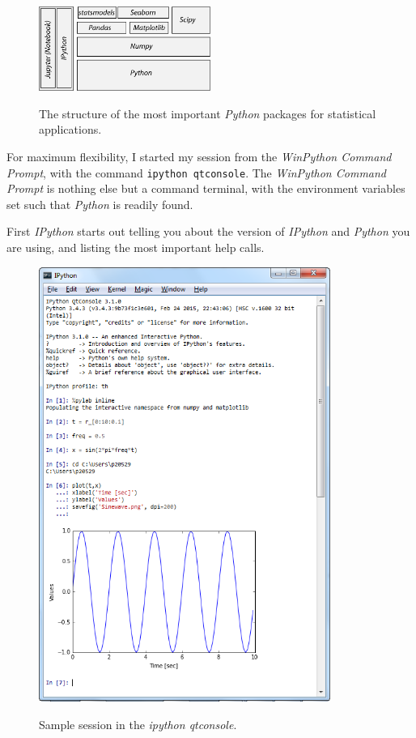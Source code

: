 \begin{figure}[h]
  \centering
  \includegraphics[width=0.5\textwidth]{../Images/ScientificPython.jpg}\\
  \caption{The structure of the most important \emph{Python} packages for statistical applications.}
  \label{fig:scientificPython}
\end{figure}

For maximum flexibility, I started my session from the \emph{WinPython Command Prompt}, with the command \lstinline{ipython qtconsole}. The \emph{WinPython Command Prompt} is nothing else but a command terminal, with the environment variables set such that \emph{Python} is readily found.

First \emph{IPython} starts out telling you about the version of \emph{IPython} and \emph{Python} you are using, and listing the most important help calls.

\begin{figure}
  \centering
  \includegraphics[width=0.85\textwidth]{../Images/qtConsole.png}\\
  \caption{Sample session in the \emph{ipython qtconsole}.}
  \label{fig:qtConsole}
\end{figure}


